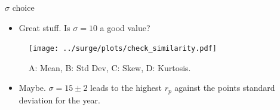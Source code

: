 \begin{frame}{$\sigma$ choice}
\vspace{-20pt}
\begin{itemize}
\item Great stuff. Is $\sigma = 10$ a good value?
\end{itemize}
\vspace{-10pt}
\begin{figure}[htb!]
    \centering
    \texttt{[image: ../surge/plots/check\_similarity.pdf]}
   \caption{A: Mean, B: Std Dev, C: Skew, D: Kurtosis.}
\end{figure}
\vspace{-20pt}
\begin{itemize}
\item Maybe. $\sigma=15\pm2$ leads to the highest $r_p$ against
      the points standard deviation for the year.
\end{itemize}
\end{frame}
